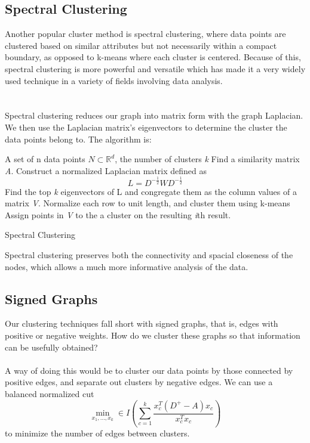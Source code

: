\documentclass[11pt]{article}
\begin{document}
\subsection{Spectral Clustering}
Another popular cluster method is spectral clustering, where data points are clustered based on similar attributes but not necessarily within a compact boundary, as opposed to k-means where each cluster is centered. Because of this, spectral clustering is more powerful and versatile which has made it a very widely used technique in a variety of fields involving data analysis.
\\ \\ \\
Spectral clustering reduces our graph into matrix form with the graph Laplacian. We then use the Laplacian matrix's eigenvectors to determine the cluster the data points belong to. The algorithm is:
\begin{algorithm}[h!]
\begin{algorithmic}[1]
\REQUIRE A set of n data points $N \subset \mathbb{R}^d$, the number of clusters \textit{k}
\STATE Find a similarity matrix \textit{A}.
\STATE Construct a normalized Laplacian matrix defined as
\begin{equation}
L = D^{-\frac{1}{2}}WD^{-\frac{1}{2}}
\end{equation}
\STATE Find the top \textit{k} eigenvectors of L and congregate them as the column values of a matrix \textit{V}.
\STATE Normalize each row to unit length, and cluster them using k-means
\STATE Assign points in \textit{V} to the a cluster on the resulting \textit{i}th result.
\end{algorithmic}
\caption{Spectral Clustering}
\label{Algo:SC}
\end{algorithm}  
Spectral clustering preserves both the connectivity and spacial closeness of the nodes, which allows a much more informative analysis of the data.
\subsection{Signed Graphs}
Our clustering techniques fall short with signed graphs, that is, edges with positive or negative weights. How do we cluster these graphs so that information can be usefully obtained?
\\ \\
A way of doing this would be to cluster our data points by those connected by positive edges, and separate out clusters by negative edges. We can use a balanced normalized cut
\begin{equation}
\min_{{x_1,\dots,x_k}} \in I (\sum_{c=1}^k\frac{x_c^T(D^+-A)x_c}{x_c^Tx_c})
\end{equation}
to minimize the number of edges between clusters. 
\end{document}

